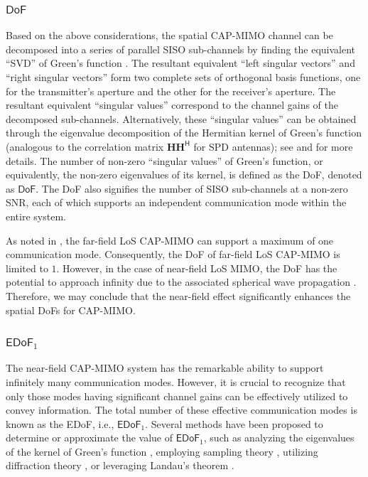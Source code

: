 \documentclass[journal]{IEEEtran}
\theoremstyle{definition}
\begin{document}
\subsubsection{${\mathsf{DoF}}$}
Based on the above considerations, the spatial CAP-MIMO channel can be decomposed into a series of parallel SISO sub-channels by finding the equivalent ``SVD'' of Green's function \cite[Eqn. (27)]{Miller2000}. The resultant equivalent ``left singular vectors'' and ``right singular vectors'' form two complete sets of orthogonal basis functions, one for the transmitter's aperture and the other for the receiver's aperture. The resultant equivalent ``singular values'' correspond to the channel gains of the decomposed sub-channels. Alternatively, these ``singular values'' can be obtained through the eigenvalue decomposition of the Hermitian kernel of Green's function (analogous to the correlation matrix ${\mathbf{H}}{\mathbf{H}}^{\mathsf{H}}$ for SPD antennas); see \cite[Eqn. (42)]{Miller2000} and \cite[Section \uppercase\expandafter{-C}]{Liu2023} for more details. The number of non-zero ``singular values'' of Green's function, or equivalently, the non-zero eigenvalues of its kernel, is defined as the DoF, denoted as ${\mathsf{DoF}}$. The DoF also signifies the number of SISO sub-channels at a non-zero SNR, each of which supports an independent communication mode within the entire system.

As noted in \cite{Miller2000}, the far-field LoS CAP-MIMO can support a maximum of one communication mode. Consequently, the DoF of far-field LoS CAP-MIMO is limited to $1$. However, in the case of near-field LoS MIMO, the DoF has the potential to approach infinity due to the associated spherical wave propagation \cite{Miller2000}. Therefore, we may conclude that the near-field effect significantly enhances the spatial DoFs for CAP-MIMO.
\subsubsection{${\mathsf{EDoF}}_1$}
The near-field CAP-MIMO system has the remarkable ability to support infinitely many communication modes. However, it is crucial to recognize that only those modes having significant channel gains can be effectively utilized to convey information. The total number of these effective communication modes is known as the EDoF, i.e., ${\mathsf{EDoF}}_1$. Several methods have been proposed to determine or approximate the value of ${\mathsf{EDoF}}_1$, such as analyzing the eigenvalues of the kernel of Green's function \cite{Miller2000}, employing sampling theory \cite{Poon2005,Dardari2020,Pizzo2023}, utilizing diffraction theory \cite{Xu2023}, or leveraging Landau's theorem \cite{Pizzo2022}.
\end{document}
